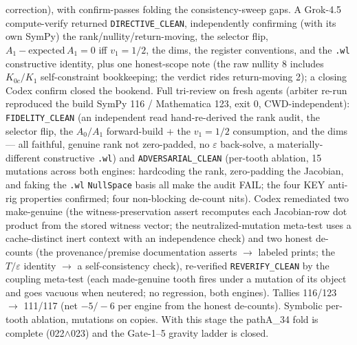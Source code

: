 correction), with confirm-passes folding the consistency-sweep gaps. A Grok-4.5 compute-verify returned \texttt{DIRECTIVE\_CLEAN},
independently confirming (with its own SymPy) the rank/nullity/return-moving, the selector flip, \(A_1-\mathrm{expected}\,A_1=0\)
iff \(v_1=1/2\), the dims, the register conventions, and the \texttt{.wl} constructive identity, plus one honest-scope note (the
raw nullity 8 includes \(K_{0c}/K_1\) self-constraint bookkeeping; the verdict rides return-moving 2); a closing Codex confirm
closed the bookend. Full tri-review on fresh agents (arbiter re-run reproduced the build SymPy 116 / Mathematica 123, exit 0,
CWD-independent): \texttt{FIDELITY\_CLEAN} (an independent read hand-re-derived the rank audit, the selector flip, the \(A_0/A_1\)
forward-build + the \(v_1=1/2\) consumption, and the dims --- all faithful, genuine rank not zero-padded, no \(\varepsilon\)
back-solve, a materially-different constructive \texttt{.wl}) and \texttt{ADVERSARIAL\_CLEAN} (per-tooth ablation, 15 mutations
across both engines: hardcoding the rank, zero-padding the Jacobian, and faking the \texttt{.wl} \texttt{NullSpace} basis all make
the audit FAIL; the four KEY anti-rig properties confirmed; four non-blocking de-count nits). Codex remediated two make-genuine
(the witness-preservation assert recomputes each Jacobian-row dot product from the stored witness vector; the neutralized-mutation
meta-test uses a cache-distinct inert context with an independence check) and two honest de-counts (the provenance/premise
documentation asserts \(\to\) labeled prints; the \(T/\varepsilon\) identity \(\to\) a self-consistency check), re-verified
\texttt{REVERIFY\_CLEAN} by the coupling meta-test (each made-genuine tooth fires under a mutation of its object and goes vacuous
when neutered; no regression, both engines). Tallies 116/123 \(\to\) 111/117 (net \(-5/-6\) per engine from the honest
de-counts). Symbolic per-tooth ablation, mutations on copies. With this stage the pathA\_34 fold is complete (022\(\wedge\)023)
and the Gate-1--5 gravity ladder is closed.
